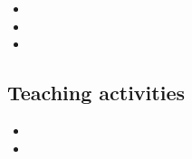 \documentclass[a4paper,12pt]{article}
\begin{document}
\begin{itemize}
\item
\item
\item
\end{itemize}



\subsection{Teaching activities}

\begin{itemize}
\item
\item
\end{itemize}







\newpage

\footnotesize{
}
\end{document}
